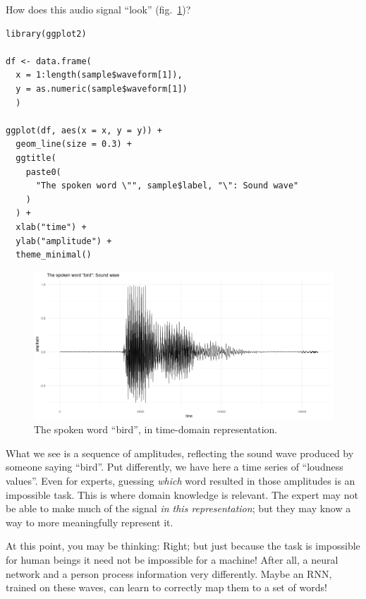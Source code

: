 \documentclass[
  letterpaper,
]{krantz}
\begin{document}
How does this audio signal ``look''
(fig.~\ref{fig-audio-bird-waveform})?

\begin{verbatim}
library(ggplot2)

df <- data.frame(
  x = 1:length(sample$waveform[1]),
  y = as.numeric(sample$waveform[1])
  )

ggplot(df, aes(x = x, y = y)) +
  geom_line(size = 0.3) +
  ggtitle(
    paste0(
      "The spoken word \"", sample$label, "\": Sound wave"
    )
  ) +
  xlab("time") +
  ylab("amplitude") +
  theme_minimal()
\end{verbatim}

\begin{figure}[H]

{\centering \includegraphics{images/audio-bird-waveform.png}

}

\caption{\label{fig-audio-bird-waveform}The spoken word ``bird'', in
time-domain representation.}

\end{figure}

What we see is a sequence of amplitudes, reflecting the sound wave
produced by someone saying ``bird''. Put differently, we have here a
time series of ``loudness values''. Even for experts, guessing
\emph{which} word resulted in those amplitudes is an impossible task.
This is where domain knowledge is relevant. The expert may not be able
to make much of the signal \emph{in this representation}; but they may
know a way to more meaningfully represent it.

At this point, you may be thinking: Right; but just because the task is
impossible for human beings it need not be impossible for a machine!
After all, a neural network and a person process information very
differently. Maybe an RNN, trained on these waves, can learn to
correctly map them to a set of words!
\end{document}
